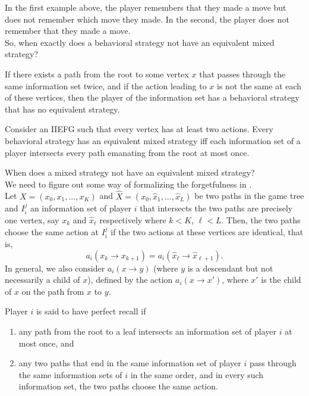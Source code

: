 		In the first example above, the player remembers that they made a move but does not remember which move they made. In the second, the player does not remember that they made a move.\\

		So, when exactly does a behavioral strategy not have an equivalent mixed strategy?

		\begin{flem}
			If there exists a path from the root to some vertex $x$ that passes through the same information set twice, and if the action leading to $x$ is not the same at each of these vertices, then the player of the information set has a behavioral strategy that has no equivalent strategy.
		\end{flem}

		\begin{ftheo}
			\label{theo: behavioral has equivalent mixed}
			Consider an IIEFG such that every vertex has at least two actions. Every behavioral strategy has an equivalent mixed strategy iff each information set of a player intersects every path emanating from the root at most once.
		\end{ftheo}

		When does a mixed strategy not have an equivalent mixed strategy?\\
		We need to figure out some way of formalizing the forgetfulness in .\\
		Let $X = (x_0,x_1,\ldots,x_K)$ and $\hat{X} = (x_0,\hat{x}_1,\ldots,\hat{x}_L)$ be two paths in the game tree and $I_i^j$ an information set of player $i$ that intersects the two paths are precisely one vertex, say $x_k$ and $\hat{x}_\ell$ respectively where $k<K$, $\ell<L$. Then, the two paths choose the same action at $I_i^j$ if the two actions at these vertices are identical, that is,
		\[  a_i(x_k \to x_{k+1}) = a_i(\hat{x}_\ell \to \hat{x}_{\ell+1}). \]
		In general, we also consider $a_i(x \to y)$ (where $y$ is a descendant but not necessarily a child of $x$), defined by the action $a_i(x \to x')$, where $x'$ is the child of $x$ on the path from $x$ to $y$.

		Player $i$ is said to have perfect recall if
		\begin{enumerate}
			\item any path from the root to a leaf intersects an information set of player $i$ at most once, and
			\item any two paths that end in the same information set of player $i$ pass through the same information sets of $i$ in the same order, and in every such information set, the two paths choose the same action.
		\end{enumerate}

